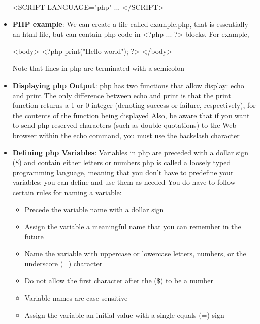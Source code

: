 \documentclass{report}
\begin{document}
\begin{itemize}
\begin{bashcode}
            <SCRIPT LANGUAGE="php"
                ...
            </SCRIPT>
            \end{bashcode}
        \item \textbf{PHP example}: We can create a file called example.php, that is essentially an html file, but can contain php code in <?php ... ?> blocks. For example,
            \bigbreak \noindent 
            \begin{bashcode}
            <body>
                <?php 
                    print("Hello world");
                ?>
            </body>
            \end{bashcode}
            \bigbreak \noindent 
            Note that lines in php are terminated with a semicolon
        \item \textbf{Displaying php Output}: php has two functions that allow display: echo and print
            \bigbreak \noindent 
            The only difference between echo and print is that the print function returns a 1 or 0 integer (denoting success or failure, respectively), for the contents of the function being displayed
            \bigbreak \noindent 
            Also, be aware that if you want to send php reserved characters (such as double quotations) to the Web browser within the echo command, you must use the backslash character
        \item \textbf{Defining php Variables}:  Variables in php are preceded with a dollar sign (\$) and contain either letters or numbers
            \bigbreak \noindent 
            php is called a loosely typed programming language, meaning that you don’t have to predefine your variables; you can define and use them as needed
            \bigbreak \noindent 
            You do have to follow certain rules for naming a variable:
            \begin{itemize}
                \item Precede the variable name with a dollar sign
                \item Assign the variable a meaningful name that you can remember in the future
                \item Name the variable with uppercase or lowercase letters, numbers, or the underscore (\_) character
                \item Do not allow the first character after the (\$) to be a number
                \item Variable names are case sensitive
                \item Assign the variable an initial value with a single equals (=) sign

\end{itemize}
\end{itemize}
\end{document}
